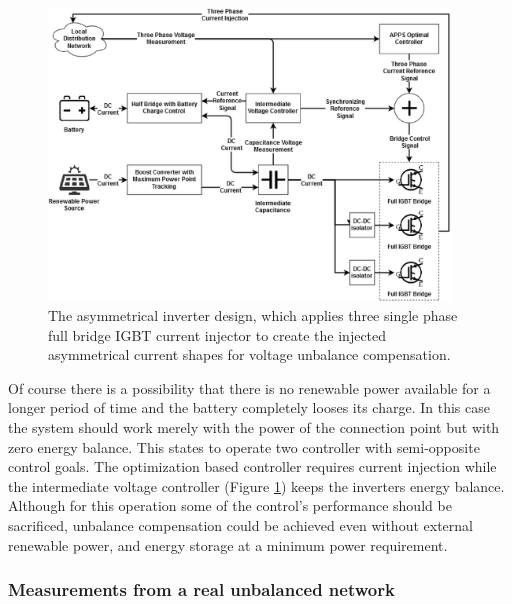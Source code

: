         \begin{figure}[ht]
        \centering
        \includegraphics[width=0.95\textwidth]{Unblance_EPS_Pics/inverter.eps}
        \caption{The asymmetrical inverter design, which applies three single phase full bridge IGBT current injector to create the injected asymmetrical current shapes for voltage unbalance compensation. }
        \label{fig:inv}
        \end{figure}

        Of course there is a possibility that there is no renewable power available for a longer period of time and the battery completely looses its charge. In this case the system should work merely with the power of the connection point but with zero energy balance. This states to operate two controller with semi-opposite control goals. The optimization based controller requires current injection while the intermediate voltage controller (Figure \ref{fig:inv}) keeps the inverters energy balance. Although for this operation some of the control's performance should be sacrificed, unbalance compensation could be achieved even without external renewable power, and energy storage at a minimum power requirement.

        \subsubsection{Measurements from a real unbalanced network}\label{VUB:sec:Measurement}

